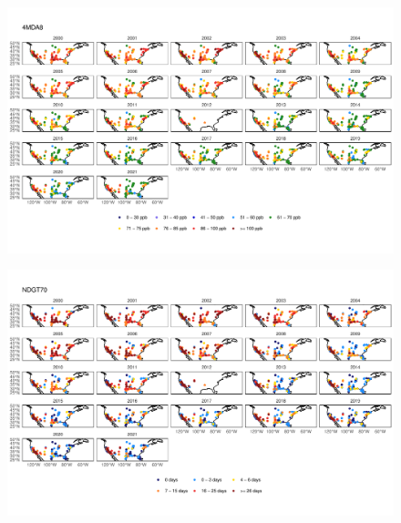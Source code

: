 \documentclass{article}
\begin{document}

\begin{figure}
\centering
\includegraphics[height=0.75\textheight]{figures/si_figures/fS16_metric_map_United-States-of-America_4MDA8.pdf}
\caption{}
\label{si_fig:metric_map_us_4MDA8}
\end{figure}
\clearpage

\begin{figure}
\centering
\includegraphics[height=0.75\textheight]{figures/si_figures/fS17_metric_map_United-States-of-America_NDGT70.pdf}
\caption{}
\label{si_fig:metric_map_us_NDGT70}
\end{figure}
\clearpage
\end{document}
